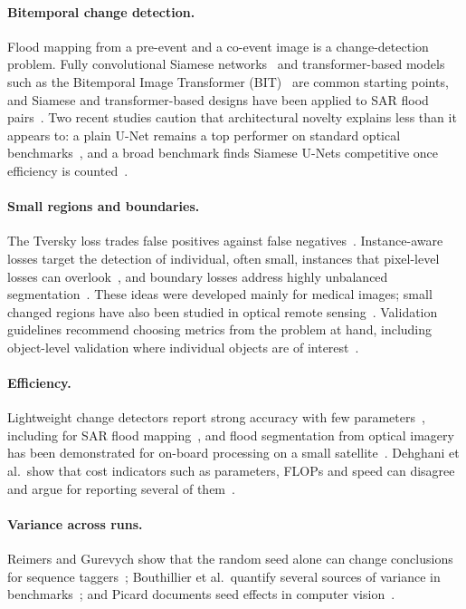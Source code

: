 \documentclass[runningheads]{llncs}
\begin{document}
\paragraph{Bitemporal change detection.} Flood mapping from a pre-event and a co-event image
is a change-detection problem. Fully convolutional Siamese networks~\cite{daudt2018fcsiam}
and transformer-based models such as the Bitemporal Image Transformer
(BIT)~\cite{chen2022bit} are common starting points, and
Siamese and transformer-based designs have been applied to SAR flood
pairs~\cite{saleh2024damnet,saleh2024token}. Two recent studies caution that architectural
novelty explains less than it appears to: a plain U-Net remains a top performer on standard
optical benchmarks~\cite{corley2024realitycheck}, and a broad benchmark finds Siamese U-Nets
competitive once efficiency is counted~\cite{tomanic2026benchmark}.

\paragraph{Small regions and boundaries.} The Tversky loss trades false positives against
false negatives~\cite{salehi2017tversky}. Instance-aware losses target the detection of individual, often small,
instances that pixel-level losses can overlook~\cite{kofler2022blobloss,rachmadi2024ici}, and boundary
losses address highly unbalanced segmentation~\cite{kervadec2019boundary}. These ideas were
developed mainly for medical images; small changed regions have also been studied in optical
remote sensing~\cite{cao2020small}. Validation guidelines recommend choosing metrics from the problem at hand, including
object-level validation where individual objects are of interest~\cite{maierhein2024metrics}.

\paragraph{Efficiency.} Lightweight change detectors report strong accuracy with few
parameters~\cite{codegoni2022tinycd}, including for SAR flood
mapping~\cite{kacmaz2026lightweight}, and flood segmentation from optical imagery has been demonstrated for on-board
processing on a small satellite~\cite{mateogarcia2021onboard}. Dehghani et al.\ show that cost indicators such as
parameters, FLOPs and speed can disagree and argue for reporting several of
them~\cite{dehghani2022efficiency}.

\paragraph{Variance across runs.} Reimers and Gurevych show that the random seed alone can
change conclusions for sequence taggers~\cite{reimers2017distributions}; Bouthillier et al.\
quantify several sources of variance in benchmarks~\cite{bouthillier2021variance}; and
Picard documents seed effects in computer vision~\cite{picard2021seed}.
\end{document}
